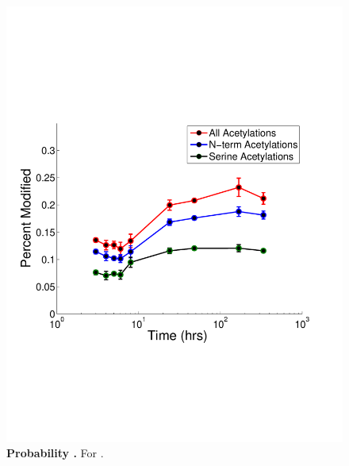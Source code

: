 \documentclass[12pt]{article}
\begin{document}
\clearpage
\begin{figure}[p]
\centerline{\includegraphics[width=5in]{Figures/Acetylation_AAs.pdf}}
\caption{\label{fig:heat_map}\textbf{Probability .} For .}
\end{figure}
\end{document}
